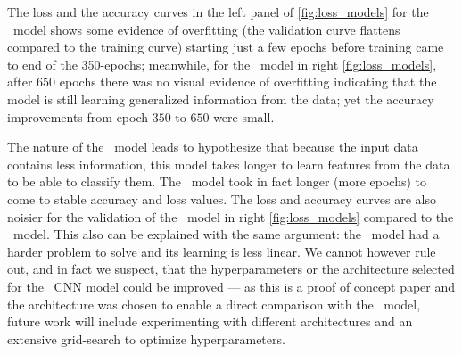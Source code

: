 The loss and the accuracy curves in the left panel of \autoref{fig:loss_models} for the \diabased\  model shows some evidence of overfitting (the validation curve flattens compared to the training curve) starting just a few epochs before training came to end of the 350-epochs; meanwhile, for the \nodia\ model in right \autoref{fig:loss_models}, after $650$ epochs there was no visual evidence of overfitting indicating that the model is still learning generalized information from the data; yet the accuracy improvements from epoch $350$ to $650$ were small.

The nature of the \nodia\ model leads to hypothesize that because the input data contains less information, this model takes longer to learn features from the data to be able to classify them. The \nodia\ model took in fact longer (more epochs) to come to stable accuracy and loss values. The loss and accuracy curves are also noisier for the validation of the \nodia\ model in right \autoref{fig:loss_models} compared to the \diabased\ model. This also can be explained with the same argument: the \nodia\ model had a harder problem to solve and its learning is less linear. We cannot however rule out, and in fact we suspect, that the hyperparameters or the architecture selected for the \nodia\ CNN model could be improved --- as this is a proof of concept paper and the architecture was chosen to enable a direct comparison with the \diabased\ model, future work will include experimenting with different architectures and an extensive grid-search to optimize hyperparameters.
